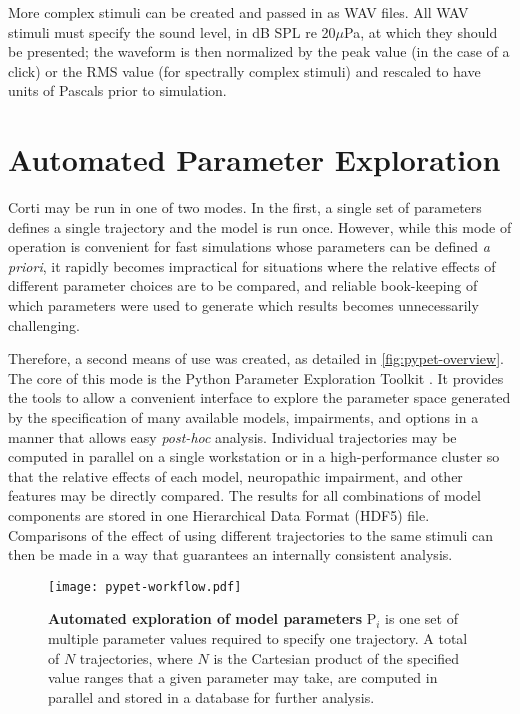 More complex stimuli can be created and passed in as WAV files.  All WAV stimuli must specify the sound level, in dB SPL re 20$\mu$Pa, at which they should be presented; the waveform is then normalized by the peak value (in the case of a click) or the RMS value (for spectrally complex stimuli) and rescaled to have units of Pascals prior to simulation.
\section{Automated Parameter Exploration} %
\label{sec:automated_parameter_exploration}
Corti may be run in one of two modes.  In the first, a single set of parameters defines a single trajectory and the model is run once.   However, while this mode of operation is convenient for fast simulations whose parameters can be defined \emph{a priori}, it rapidly becomes impractical for situations where the relative effects of different parameter choices are to be compared, and reliable book-keeping of which parameters were used to generate which results becomes unnecessarily challenging.

Therefore, a second means of use was created, as detailed in \autoref{fig:pypet-overview}. The core of this mode is the Python Parameter Exploration Toolkit \citep{Meyer2016Pypet}. It provides the tools to allow a convenient interface to explore the parameter space generated by the specification of many available models, impairments, and options in a manner that allows easy \emph{post-hoc} analysis. Individual trajectories may be computed in parallel on a single workstation or in a high-performance cluster so that the relative effects of each model, neuropathic impairment, and other features may be directly compared.  The results for all combinations of model components are stored in one Hierarchical Data Format (HDF5) file.  Comparisons of the effect of using different trajectories to the same stimuli can then be made in a way that guarantees an internally consistent analysis.

\begin{figure}[htbp]
	\centering
	\texttt{[image: pypet-workflow.pdf]}
	\caption[Automated Exploration of Model Parameters]{\textbf{Automated exploration of model parameters} P$_i$ is one set of multiple parameter values required to specify one trajectory.  A total of $N$ trajectories, where $N$ is the Cartesian product of the specified value ranges that a given parameter may take, are computed in parallel and stored in a database for further analysis. }
	\label{fig:pypet-overview}
\end{figure}
